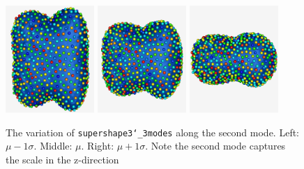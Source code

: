 \documentclass[letterpaper,12pt]{article}   %
\begin{document}
\vspace{0.1in}
\begin{figure}[!htp]
\centering
\includegraphics[width=0.3\textwidth]{figs/supershapes_3mode_mod2_neg1std.png}
\includegraphics[width=0.3\textwidth]{figs/supershapes_3mode_mod2_0std.png}
\includegraphics[width=0.3\textwidth]{figs/supershapes_3mode_mod2_1std.png}
\caption{The variation of \texttt{supershape3\char`_3modes} along the second mode. Left: $\mu - 1\sigma$. Middle: $\mu$. Right: $\mu + 1\sigma$. Note the second mode captures the scale in the z-direction}
\label{fig:supershape_3modes_mod2}
\end{figure}
\end{document}
